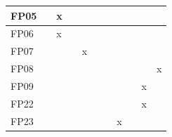 \begin{table}
\begin{tabular}{l|l|l|l|l|l|l|l|l|l|l}
          \hline
          FP05 &                                & x                              &                                &                                &                                &                                &                                &                                &                                &                                \\
          \hline
          FP06 &                                & x                              &                                &                                &                                &                                &                                &                                &                                &                                \\
          \hline
          FP07 &                                &                                &                                & x                              &                                &                                &                                &                                &                                &                                \\
          \hline
          FP08 &                                &                                &                                &                                &                                &                                &                                &                                &                                & x                              \\
          \hline
          FP09 &                                &                                &                                &                                &                                &                                &                                &                                & x                              &                                \\
          \hline
          FP22 &                                &                                &                                &                                &                                &                                &                                &                                & x                              &                                \\
          \hline
          FP23 &                                &                                &                                &                                &                                &                                & x                              &                                &                                &                                \\

\end{tabular}
\end{table}
